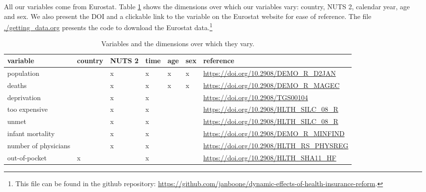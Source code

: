 \documentclass[a4paper,12pt]{article}
\begin{document}
All our variables come from Eurostat. Table \ref{tab:VariablesDimensions} shows the dimensions over which our variables vary: country, NUTS 2, calendar year, age and sex. We also present the DOI and a clickable link to the variable on the Eurostat website for ease of reference. The file \url{./getting\_data.org} presents the code to download the Eurostat data.\footnote{This file can be found in the github repository: \href{https://github.com/janboone/dynamic-effects-of-health-insurance-reform}{https://github.com/janboone/dynamic-effects-of-health-insurance-reform}.}


\begin{table}[htbp]
\caption{\label{tab:VariablesDimensions}Variables and the dimensions over which they vary.}
\centering
\begin{tabular}{lllllll}
variable & country & NUTS 2 & time & age & sex & reference\\
\hline
population &  & x & x & x & x & \href{https://ec.europa.eu/eurostat/databrowser/view/DEMO\_R\_D2JAN/default/table?lang=en\&category=demo.demopreg}{https://doi.org/10.2908/DEMO\_R\_D2JAN}\\
deaths &  & x & x & x & x & \href{https://ec.europa.eu/eurostat/databrowser/view/DEMO\_R\_MAGEC/default/table?lang=en\&category=demo.demomreg}{https://doi.org/10.2908/DEMO\_R\_MAGEC}\\
deprivation &  & x & x &  &  & \href{https://ec.europa.eu/eurostat/databrowser/view/tgs00104/default/table?lang=en}{https://doi.org/10.2908/TGS00104}\\
too expensive &  & x & x &  &  & \href{https://ec.europa.eu/eurostat/databrowser/view/hlth\_silc\_08\_r/default/table?lang=en}{https://doi.org/10.2908/HLTH\_SILC\_08\_R}\\
unmet &  & x & x &  &  & \href{https://ec.europa.eu/eurostat/databrowser/view/hlth\_silc\_08\_r/default/table?lang=en}{https://doi.org/10.2908/HLTH\_SILC\_08\_R}\\
infant mortality &  & x & x &  &  & \href{https://ec.europa.eu/eurostat/databrowser/view/DEMO\_R\_MINFIND/default/table?lang=en\&category=demo.demomreg}{https://doi.org/10.2908/DEMO\_R\_MINFIND}\\
number of physicians &  & x & x &  &  & \href{https://ec.europa.eu/eurostat/databrowser/view/hlth\_rs\_physreg/default/table?lang=en\&category=hlth.hlth\_care.hlth\_res.hlth\_staff}{https://doi.org/10.2908/HLTH\_RS\_PHYSREG}\\
out-of-pocket & x &  & x &  &  & \href{https://ec.europa.eu/eurostat/databrowser/view/hlth\_sha11\_hf/default/table?lang=en}{https://doi.org/10.2908/HLTH\_SHA11\_HF}\\

\end{tabular}
\end{table}
\end{document}
